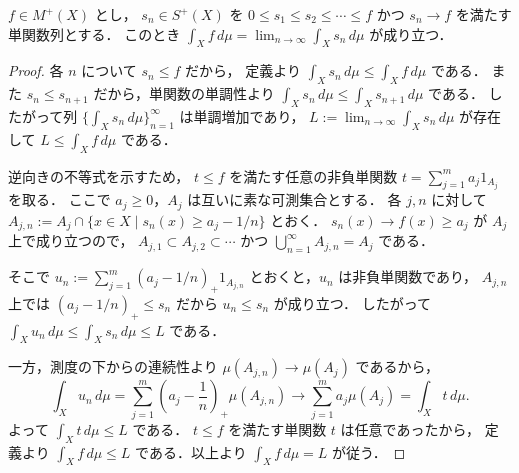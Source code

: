 \begin{theorem}[非負可測関数の積分は単関数近似の極限]\label{thm:nonnegative-integral-simple-approximation}
$f\in M^+(X)$ とし，
$s_n\in S^+(X)$ を $0 \le s_1 \le s_2 \le \cdots \le f$ かつ $s_n \to f$ を満たす単関数列とする．
このとき $\int_X f\,d\mu=\lim_{n\to\infty}\int_X s_n\,d\mu$ が成り立つ．
\end{theorem}
\begin{proof}
各 $n$ について $s_n \le f$ だから，
定義より $\int_X s_n\,d\mu \le \int_X f\,d\mu$ である．
また $s_n \le s_{n+1}$ だから，単関数の単調性より
$\int_X s_n\,d\mu \le \int_X s_{n+1}\,d\mu$ である．
したがって列 $\{\int_X s_n\,d\mu\}_{n=1}^{\infty}$ は単調増加であり，
$L:=\lim_{n\to\infty}\int_X s_n\,d\mu$ が存在して $L \le \int_X f\,d\mu$ である．

逆向きの不等式を示すため，
$t \le f$ を満たす任意の非負単関数 $t=\sum_{j=1}^m a_j 1_{A_j}$ を取る．
ここで $a_j \ge 0$，$A_j$ は互いに素な可測集合とする．
各 $j,n$ に対して
$A_{j,n}:=A_j \cap \{x \in X \mid s_n(x)\ge a_j-1/n\}$ とおく．
$s_n(x)\to f(x)\ge a_j$ が $A_j$ 上で成り立つので，
$A_{j,1}\subset A_{j,2}\subset \cdots$ かつ $\bigcup_{n=1}^{\infty}A_{j,n}=A_j$ である．

そこで
$u_n:=\sum_{j=1}^m (a_j-1/n)_+ 1_{A_{j,n}}$ とおくと，$u_n$ は非負単関数であり，
$A_{j,n}$ 上では $(a_j-1/n)_+ \le s_n$ だから $u_n \le s_n$ が成り立つ．
したがって
$\int_X u_n\,d\mu \le \int_X s_n\,d\mu \le L$ である．

一方，測度の下からの連続性より
$\mu(A_{j,n}) \to \mu(A_j)$ であるから，
\[
\int_X u_n\,d\mu
=\sum_{j=1}^m \left(a_j-\frac1n\right)_+ \mu(A_{j,n})
\to \sum_{j=1}^m a_j \mu(A_j)
=\int_X t\,d\mu.
\]
よって
$\int_X t\,d\mu \le L$ である．
$t \le f$ を満たす単関数 $t$ は任意であったから，
定義より $\int_X f\,d\mu \le L$ である．以上より $\int_X f\,d\mu=L$ が従う．
\end{proof}

